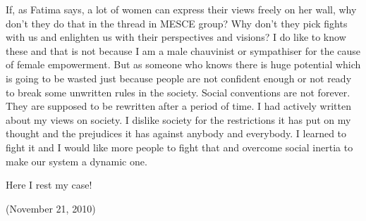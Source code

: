 \begin{english}
If, as Fatima says, a lot of women can express their views freely on her wall, why don't they do that in 
the thread in MESCE group? Why don't they pick fights with us and enlighten us with their perspectives 
and visions? I do like to know these and that is not because I am a male chauvinist or sympathiser 
for the cause of female empowerment. But as someone who knows there is huge potential which is 
going to be wasted just because people are not confident enough or not ready to break some unwritten 
rules in the society. Social conventions are not forever. They are supposed to be rewritten after a period of 
time. I had actively written about my views on society. I dislike society for the restrictions it has put on 
my thought and the prejudices it has against anybody and everybody. I learned to fight it and I would like 
more people to fight that and overcome social inertia to make our system a dynamic one.

Here I rest my case!
\begin{flushright}(November 21, 2010)\end{flushright}
\end{english}
\newpage
